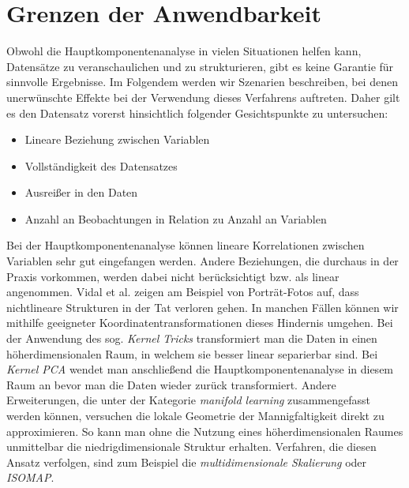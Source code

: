 

\section{Grenzen der Anwendbarkeit} \label{theo_results}

Obwohl die Hauptkomponentenanalyse in vielen Situationen helfen kann, Datensätze zu veranschaulichen und zu strukturieren, gibt es keine Garantie für sinnvolle Ergebnisse. Im Folgendem werden wir Szenarien beschreiben, bei denen unerwünschte Effekte bei der Verwendung dieses Verfahrens auftreten. Daher gilt es den Datensatz vorerst hinsichtlich folgender Gesichtspunkte zu untersuchen: 

\begin{itemize}
\item Lineare Beziehung zwischen Variablen
\item Vollständigkeit des Datensatzes
\item Ausreißer in den Daten
\item Anzahl an Beobachtungen in Relation zu Anzahl an Variablen
\end{itemize}

Bei der Hauptkomponentenanalyse können lineare Korrelationen zwischen Variablen sehr gut eingefangen werden. Andere Beziehungen, die durchaus in der Praxis vorkommen, werden dabei nicht berücksichtigt bzw. als linear angenommen. Vidal et al. \cite{vidal} zeigen am Beispiel von Porträt-Fotos auf, dass nichtlineare Strukturen in der Tat verloren gehen. In manchen Fällen können wir mithilfe geeigneter Koordinatentransformationen dieses Hindernis umgehen. Bei der Anwendung des sog. \textit{Kernel Tricks} transformiert man die Daten in einen höherdimensionalen Raum, in welchem sie besser linear separierbar sind. Bei \textit{Kernel PCA} wendet man anschließend die Hauptkomponentenanalyse in diesem Raum an bevor man die Daten wieder zurück transformiert. Andere Erweiterungen, die unter der Kategorie \textit{manifold learning} zusammengefasst werden können, versuchen die lokale Geometrie der Mannigfaltigkeit direkt zu approximieren. So kann man ohne die Nutzung eines höherdimensionalen Raumes unmittelbar die niedrigdimensionale Struktur erhalten. Verfahren, die diesen Ansatz verfolgen, sind zum Beispiel die \textit{multidimensionale Skalierung} oder \textit{ISOMAP}. \cite{lee}

